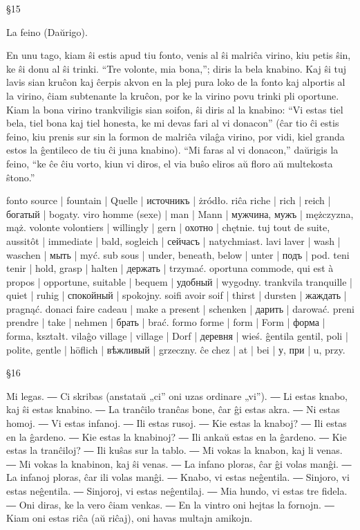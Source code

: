 §15

La feino (Daŭrigo).

En unu tago, kiam ŝi estis apud tiu fonto, venis al ŝi malriĉa virino, kiu petis ŝin, ke ŝi donu al ŝi trinki. “Tre volonte, mia bona,”; diris la bela knabino. Kaj ŝi tuj lavis sian kruĉon kaj ĉerpis akvon en la plej pura loko de la fonto kaj alportis al la virino, ĉiam subtenante la kruĉon, por ke la virino povu trinki pli oportune. Kiam la bona virino trankviligis sian soifon, ŝi diris al la knabino: “Vi estas tiel bela, tiel bona kaj tiel honesta, ke mi devas fari al vi donacon” (ĉar tio ĉi estis feino, kiu prenis sur sin la formon de malriĉa vilaĝa virino, por vidi, kiel granda estos la ĝentileco de tiu ĉi juna knabino). “Mi faras al vi donacon,” daŭrigis la feino, “ke ĉe ĉiu vorto, kiun vi diros, el via buŝo eliros aŭ floro aŭ multekosta ŝtono.”

fonto source | fountain | Quelle | источникъ | żródło.
riĉa riche | rich | reich | богатый | bogaty.
viro homme (sexe) | man | Mann | мужчина, мужъ | mężczyzna, mąż.
volonte volontiers | willingly | gern | охотно | chętnie.
tuj tout de suite, aussitôt | immediate | bald, sogleich | сейчасъ | natychmiast.
lavi laver | wash | waschen | мыть | myć.
sub sous | under, beneath, below | unter | подъ | pod.
teni tenir | hold, grasp | halten | держать | trzymać.
oportuna commode, qui est à propos | opportune, suitable | bequem | удобный | wygodny.
trankvila tranquille | quiet | ruhig | спокойный | spokojny.
soifi avoir soif | thirst | dursten | жаждать | pragnąć.
donaci faire cadeau | make a present | schenken | дарить | darować.
preni prendre | take | nehmen | брать | brać.
formo forme | form | Form | форма | forma, kształt.
vilaĝo village | village | Dorf | деревня | wieś.
ĝentila gentil, poli | polite, gentle | höflich | вѣжливый | grzeczny.
ĉe chez | at | bei | у, при | u, przy.

§16

Mi legas. ― Ci skribas (anstataŭ „ci” oni uzas ordinare „vi”). ― Li estas knabo, kaj ŝi estas knabino. ― La tranĉilo tranĉas bone, ĉar ĝi estas akra. ― Ni estas homoj. ― Vi estas infanoj. ― Ili estas rusoj. ― Kie estas la knaboj? ― Ili estas en la ĝardeno. ― Kie estas la knabinoj? ― Ili ankaŭ estas en la ĝardeno. ― Kie estas la tranĉiloj? ― Ili kuŝas sur la tablo. ― Mi vokas la knabon, kaj li venas. ― Mi vokas la knabinon, kaj ŝi venas. ― La infano ploras, ĉar ĝi volas manĝi. ― La infanoj ploras, ĉar ili volas manĝi. ― Knabo, vi estas neĝentila. ― Sinjoro, vi estas neĝentila. ― Sinjoroj, vi estas neĝentilaj. ― Mia hundo, vi estas tre fidela. ― Oni diras, ke la vero ĉiam venkas. ― En la vintro oni hejtas la fornojn. ― Kiam oni estas riĉa (aŭ riĉaj), oni havas multajn amikojn.

